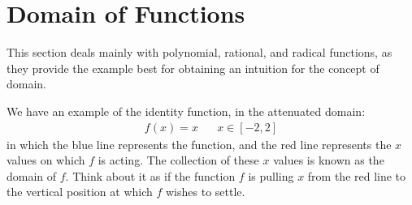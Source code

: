 \section{Domain of Functions}

This section deals mainly with polynomial, rational, and radical functions, as they provide the example best for obtaining an intuition for the concept of domain.

\begin{example}
We have an example of the identity function, in the attenuated domain:
\begin{align*}
    f(x) = x \hspace{20pt} x \in [-2, 2]
\end{align*}
in which the blue line represents the function, and the red line represents the $x$ values on which $f$ is acting. The collection of these $x$ values is known as the domain of $f$. Think about it as if the function $f$ is pulling $x$ from the red line to the vertical position at which $f$ wishes to settle. 

\vspace{0.5in}
\end{example}
